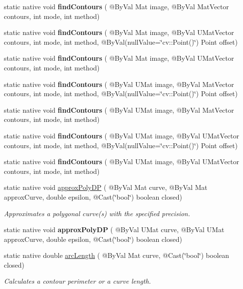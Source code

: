 \begin{DoxyCompactItemize}
\item 
static native void {\bfseries find\+Contours} ( @By\+Val Mat image, @By\+Val Mat\+Vector contours, int mode, int method)
\item 
static native void {\bfseries find\+Contours} ( @By\+Val Mat image, @By\+Val U\+Mat\+Vector contours, int mode, int method, @By\+Val(null\+Value=\char`\"{}cv\+::\+Point()\char`\"{}) Point offset)
\item 
static native void {\bfseries find\+Contours} ( @By\+Val Mat image, @By\+Val U\+Mat\+Vector contours, int mode, int method)
\item 
static native void {\bfseries find\+Contours} ( @By\+Val U\+Mat image, @By\+Val Mat\+Vector contours, int mode, int method, @By\+Val(null\+Value=\char`\"{}cv\+::\+Point()\char`\"{}) Point offset)
\item 
static native void {\bfseries find\+Contours} ( @By\+Val U\+Mat image, @By\+Val Mat\+Vector contours, int mode, int method)
\item 
static native void {\bfseries find\+Contours} ( @By\+Val U\+Mat image, @By\+Val U\+Mat\+Vector contours, int mode, int method, @By\+Val(null\+Value=\char`\"{}cv\+::\+Point()\char`\"{}) Point offset)
\item 
static native void {\bfseries find\+Contours} ( @By\+Val U\+Mat image, @By\+Val U\+Mat\+Vector contours, int mode, int method)
\item 
static native void \hyperlink{group__imgproc__shape_ga59b2a13c4f741e0898f8415d9436d8a0}{approx\+Poly\+DP} ( @By\+Val Mat curve, @By\+Val Mat approx\+Curve, double epsilon, @Cast(\char`\"{}bool\char`\"{}) boolean closed)
\begin{DoxyCompactList}\small\item\em Approximates a polygonal curve(s) with the specified precision. \end{DoxyCompactList}\item 
static native void {\bfseries approx\+Poly\+DP} ( @By\+Val U\+Mat curve, @By\+Val U\+Mat approx\+Curve, double epsilon, @Cast(\char`\"{}bool\char`\"{}) boolean closed)
\item 
static native double \hyperlink{group__imgproc__shape_gad6c8dc05432d5351a7480042bbbbe328}{arc\+Length} ( @By\+Val Mat curve, @Cast(\char`\"{}bool\char`\"{}) boolean closed)
\begin{DoxyCompactList}\small\item\em Calculates a contour perimeter or a curve length. \end{DoxyCompactList}\item 

\end{DoxyCompactItemize}
